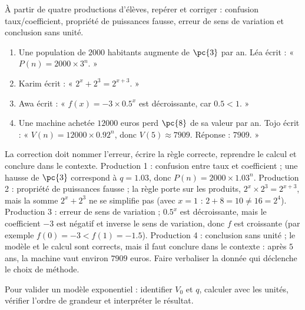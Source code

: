 \begin{activity}
À partir de quatre productions d'élèves, repérer et corriger : confusion taux/coefficient, propriété de puissances fausse, erreur de sens de variation et conclusion sans unité.
\begin{enumerate}[label=\textbf{Production \arabic*.},leftmargin=*]
\item Une population de $\num{2000}$ habitants augmente de $\pc{3}$ par an. Léa écrit : « $P(n)=\num{2000}\times3^n$. »
\item Karim écrit : « $2^x+2^3=2^{x+3}$. »
\item Awa écrit : « $f(x)=-3\times\num{0,5}^x$ est décroissante, car $\num{0,5}<1$. »
\item Une machine achetée $\num{12000}$ euros perd $\pc{8}$ de sa valeur par an. Tojo écrit : « $V(n)=\num{12000}\times\num{0,92}^n$, donc $V(5)\approx\num{7909}$. Réponse : $\num{7909}$. »
\end{enumerate}

\end{activity}
\begin{solution}La correction doit nommer l'erreur, écrire la règle correcte, reprendre le calcul et conclure dans le contexte. Production 1 : confusion entre taux et coefficient ; une hausse de $\pc{3}$ correspond à $q=\num{1,03}$, donc $P(n)=\num{2000}\times\num{1,03}^n$. Production 2 : propriété de puissances fausse ; la règle porte sur les produits, $2^x\times2^3=2^{x+3}$, mais la somme $2^x+2^3$ ne se simplifie pas (avec $x=1$ : $2+8=10\neq16=2^4$). Production 3 : erreur de sens de variation ; $\num{0,5}^x$ est décroissante, mais le coefficient $-3$ est négatif et inverse le sens de variation, donc $f$ est croissante (par exemple $f(0)=-3<f(1)=-\num{1,5}$). Production 4 : conclusion sans unité ; le modèle et le calcul sont corrects, mais il faut conclure dans le contexte : après $5$ ans, la machine vaut environ $\num{7909}$ euros. Faire verbaliser la donnée qui déclenche le choix de méthode.\end{solution}

\begin{summary}Pour valider un modèle exponentiel : identifier $V_0$ et $q$, calculer avec les unités, vérifier l'ordre de grandeur et interpréter le résultat.\end{summary}

